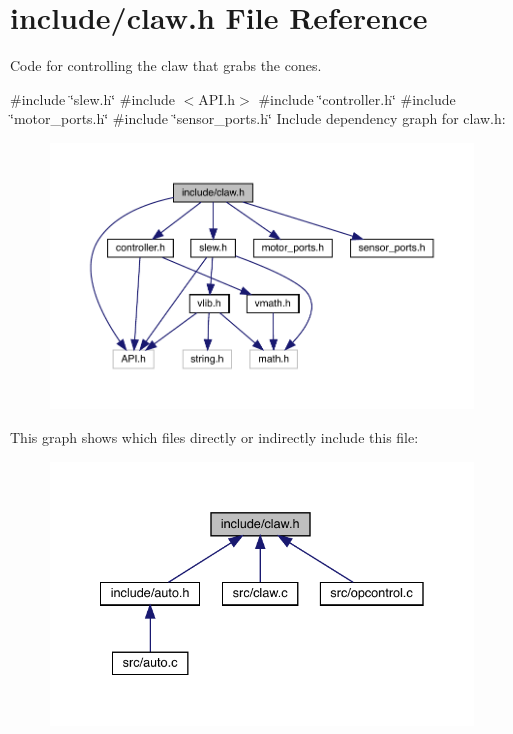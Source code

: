 \section{include/claw.h File Reference}
\label{claw_8h}


Code for controlling the claw that grabs the cones.  


{\ttfamily \#include \char`\"{}slew.\+h\char`\"{}}\newline
{\ttfamily \#include $<$A\+P\+I.\+h$>$}\newline
{\ttfamily \#include \char`\"{}controller.\+h\char`\"{}}\newline
{\ttfamily \#include \char`\"{}motor\+\_\+ports.\+h\char`\"{}}\newline
{\ttfamily \#include \char`\"{}sensor\+\_\+ports.\+h\char`\"{}}\newline
Include dependency graph for claw.\+h\+:\nopagebreak
\begin{figure}[H]
\begin{center}
\leavevmode
\includegraphics[width=350pt]{claw_8h__incl}
\end{center}
\end{figure}
This graph shows which files directly or indirectly include this file\+:\nopagebreak
\begin{figure}[H]
\begin{center}
\leavevmode
\includegraphics[width=335pt]{claw_8h__dep__incl}
\end{center}
\end{figure}
